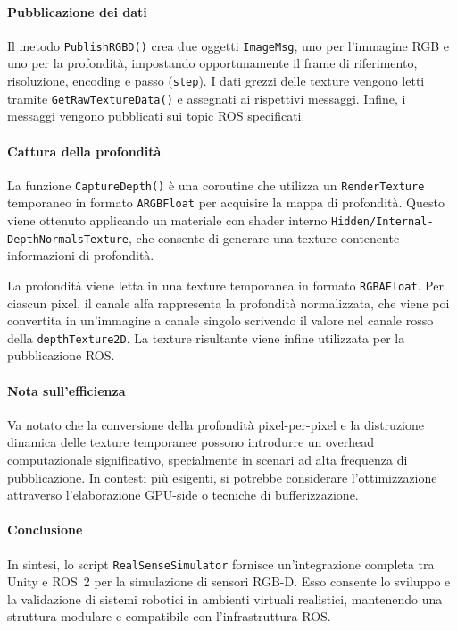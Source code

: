 \documentclass[11pt]{report}
\begin{document}
\paragraph{Pubblicazione dei dati}
Il metodo \texttt{PublishRGBD()} crea due oggetti \texttt{ImageMsg}, uno per l’immagine RGB e uno per la profondità, impostando opportunamente il frame di riferimento, risoluzione, encoding e passo (\texttt{step}). I dati grezzi delle texture vengono letti tramite \texttt{GetRawTextureData()} e assegnati ai rispettivi messaggi. Infine, i messaggi vengono pubblicati sui topic ROS specificati.

\paragraph{Cattura della profondità}
La funzione \texttt{CaptureDepth()} è una coroutine che utilizza un \texttt{RenderTexture} temporaneo in formato \texttt{ARGBFloat} per acquisire la mappa di profondità. Questo viene ottenuto applicando un materiale con shader interno \texttt{Hidden/Internal-DepthNormalsTexture}, che consente di generare una texture contenente informazioni di profondità.

La profondità viene letta in una texture temporanea in formato \texttt{RGBAFloat}. Per ciascun pixel, il canale alfa rappresenta la profondità normalizzata, che viene poi convertita in un'immagine a canale singolo scrivendo il valore nel canale rosso della \texttt{depthTexture2D}. La texture risultante viene infine utilizzata per la pubblicazione ROS.

\paragraph{Nota sull'efficienza}
Va notato che la conversione della profondità pixel-per-pixel e la distruzione dinamica delle texture temporanee possono introdurre un overhead computazionale significativo, specialmente in scenari ad alta frequenza di pubblicazione. In contesti più esigenti, si potrebbe considerare l'ottimizzazione attraverso l'elaborazione GPU-side o tecniche di bufferizzazione.

\paragraph{Conclusione}
In sintesi, lo script \texttt{RealSenseSimulator} fornisce un'integrazione completa tra Unity e ROS~2 per la simulazione di sensori RGB-D. Esso consente lo sviluppo e la validazione di sistemi robotici in ambienti virtuali realistici, mantenendo una struttura modulare e compatibile con l'infrastruttura ROS.
\end{document}
